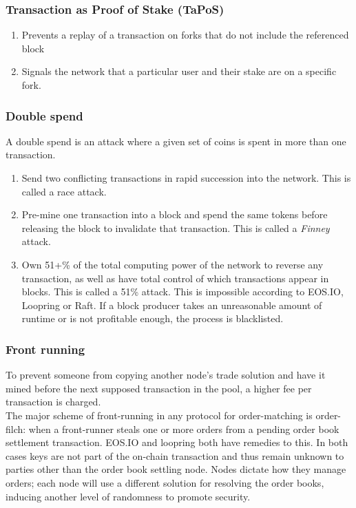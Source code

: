 \documentclass[]{article}
\begin{document}
		\subsubsection{Transaction as Proof of Stake (TaPoS)}
			\begin{enumerate}
				\item Prevents a replay of a transaction on forks that do not include the referenced block 
				\item Signals the network that a particular user and their stake are on a specific fork.
			\end{enumerate}
		\subsubsection{Double spend}
		A double spend is an attack where a given set of coins is spent in more than one transaction.
		\begin{enumerate}
			\item Send two conflicting transactions in rapid succession into the network. This is called a race attack. 
			\item Pre-mine one transaction into a block and spend the same tokens before releasing the block to invalidate that transaction. 
			This is called a \textit{Finney} attack.
			\item Own 51+\% of the total computing power of the network to reverse any transaction, 
			as well as have total control of which transactions appear in blocks. 
			This is called a 51\% attack.
			This is impossible according to EOS.IO, Loopring or Raft.
			If a block producer takes an unreasonable amount of runtime or is not profitable enough, the process is blacklisted.\cite{7}
		\end{enumerate} 

		\subsubsection{Front running}
		To prevent someone from copying another node's trade solution 
		and have it mined before the next supposed transaction in the pool, 
		a higher fee per transaction is charged.\\ 
		The major scheme of front-running in any protocol for
		order-matching is order-filch: when a front-runner steals
		one or more orders from a pending order book settlement
		transaction. EOS.IO and loopring both have remedies to this.
		In both cases keys are not part of the on-chain transaction and thus remain unknown to parties other than the order book settling node.
		Nodes dictate how they manage orders;
		each node will use a different solution for resolving the order books, inducing another level of randomness to promote security.
			
\end{document}
